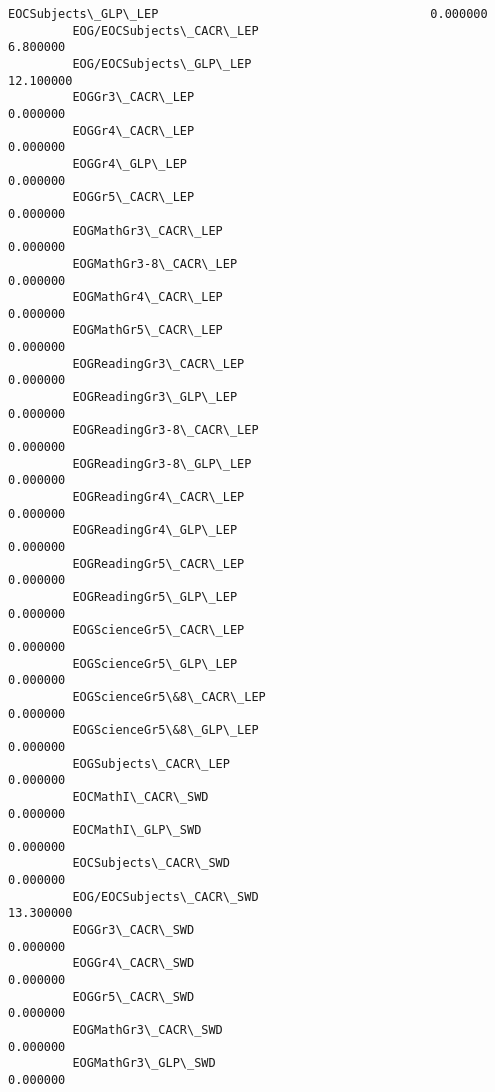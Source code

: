 \documentclass[11pt]{article}
\begin{document}
\begin{Verbatim}[commandchars=\\\{\}]
         EOCSubjects\_GLP\_LEP                                      0.000000   
         EOG/EOCSubjects\_CACR\_LEP                                 6.800000   
         EOG/EOCSubjects\_GLP\_LEP                                 12.100000   
         EOGGr3\_CACR\_LEP                                          0.000000   
         EOGGr4\_CACR\_LEP                                          0.000000   
         EOGGr4\_GLP\_LEP                                           0.000000   
         EOGGr5\_CACR\_LEP                                          0.000000   
         EOGMathGr3\_CACR\_LEP                                      0.000000   
         EOGMathGr3-8\_CACR\_LEP                                    0.000000   
         EOGMathGr4\_CACR\_LEP                                      0.000000   
         EOGMathGr5\_CACR\_LEP                                      0.000000   
         EOGReadingGr3\_CACR\_LEP                                   0.000000   
         EOGReadingGr3\_GLP\_LEP                                    0.000000   
         EOGReadingGr3-8\_CACR\_LEP                                 0.000000   
         EOGReadingGr3-8\_GLP\_LEP                                  0.000000   
         EOGReadingGr4\_CACR\_LEP                                   0.000000   
         EOGReadingGr4\_GLP\_LEP                                    0.000000   
         EOGReadingGr5\_CACR\_LEP                                   0.000000   
         EOGReadingGr5\_GLP\_LEP                                    0.000000   
         EOGScienceGr5\_CACR\_LEP                                   0.000000   
         EOGScienceGr5\_GLP\_LEP                                    0.000000   
         EOGScienceGr5\&8\_CACR\_LEP                                 0.000000   
         EOGScienceGr5\&8\_GLP\_LEP                                  0.000000   
         EOGSubjects\_CACR\_LEP                                     0.000000   
         EOCMathI\_CACR\_SWD                                        0.000000   
         EOCMathI\_GLP\_SWD                                         0.000000   
         EOCSubjects\_CACR\_SWD                                     0.000000   
         EOG/EOCSubjects\_CACR\_SWD                                13.300000   
         EOGGr3\_CACR\_SWD                                          0.000000   
         EOGGr4\_CACR\_SWD                                          0.000000   
         EOGGr5\_CACR\_SWD                                          0.000000   
         EOGMathGr3\_CACR\_SWD                                      0.000000   
         EOGMathGr3\_GLP\_SWD                                       0.000000   

\end{Verbatim}
\end{document}
